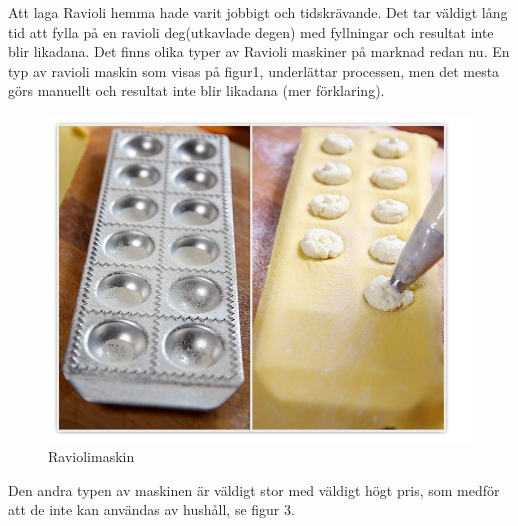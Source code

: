 Att laga Ravioli hemma hade varit jobbigt och tidskrävande. Det tar väldigt lång tid att fylla på en ravioli deg(utkavlade degen) med fyllningar och resultat inte blir likadana.
Det finns olika typer av Ravioli maskiner på marknad redan nu. En typ av ravioli maskin som visas på figur1, underlättar processen, men det mesta görs manuellt och resultat inte blir likadana (mer förklaring).\\

	 		 		\begin{figure}[h]
	 		 			\begin{center}
	 		 				\includegraphics[scale=0.5]{images/raviolimoldwithfilling.jpg}
	 		 				\caption{Raviolimaskin}
	 		 				\label{ravioli}	
	 		 			\end{center}
	 		 		\end{figure}
Den andra typen av maskinen är väldigt stor med väldigt högt pris, som medför att de inte kan användas av hushåll, se figur 3.
